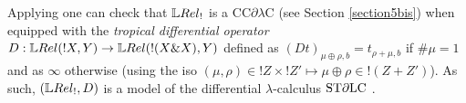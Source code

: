 Applying \cite[Theorem 6.1]{lemay2020} one can check that
 $\LREL_!$ is a CC$\partial\lambda$C (see Section \ref{section5bis}) when equipped with the \emph{tropical differential operator} $D:\HOM{\LREL}{!X}{Y}\to \HOM{\LREL}{!(X\& X)}{Y}$ defined as $(Dt)_{\mu\oplus\rho,b}=t_{\rho+\mu,b}$ if $\#\mu=1$ and as $\infty$ otherwise (using the iso $(\mu,\rho)\in !Z\times !Z'\mapsto\mu\oplus\rho \in !(Z+Z')$).
As such, $(\LREL_!,D)$ is a model of the differential $\lambda$-calculus $\mathrm{ST}\partial\mathrm{LC}$ \cite{ER}.

